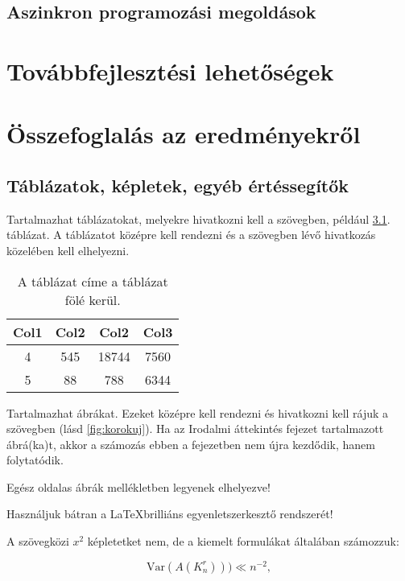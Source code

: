 \documentclass[a4paper,12pt]{report}
\theoremstyle{definition}
\theoremstyle{remark}
\begin{document}
\section{Aszinkron programozási megoldások}

\chapter{Továbbfejlesztési lehetőségek}

\chapter{Összefoglalás az eredményekről}
\section{Táblázatok, képletek, egyéb értéssegítők}

Tartalmazhat táblázatokat, melyekre hivatkozni kell a szövegben, például \ref{table:2}. táblázat. A táblázatot középre kell rendezni és a szövegben lévő hivatkozás közelében kell elhelyezni.

\begin{table}[h!]
\centering
\caption{A táblázat címe a táblázat fölé kerül.}
\label{table:2}
\vspace{.2 cm}
\begin{tabular}{||c c c c||} 
 \hline
 Col1 & Col2 & Col2 & Col3 \\ [0.5ex] 
 \hline\hline
  4 & 545 & 18744 & 7560 \\
 5 & 88 & 788 & 6344 \\ [1ex] 
 \hline
\end{tabular}
\end{table}




Tartalmazhat ábrákat. Ezeket középre kell rendezni és hivatkozni kell rájuk a szövegben (lásd \ref{fig:korokuj}). Ha az Irodalmi áttekintés fejezet tartalmazott ábrá(ka)t, akkor a számozás ebben a fejezetben nem újra kezdődik, hanem folytatódik.

Egész oldalas ábrák mellékletben legyenek elhelyezve!

Használjuk bátran a \LaTeX  brilliáns egyenletszerkesztő rendszerét!

A szövegközi $x^2$ képletetket nem, de a kiemelt formulákat általában számozzuk:

 \begin{equation}\label{circle-area}
\mathrm{Var} (A(K_n^r)))\ll n^{-2},
\end{equation}
\end{document}
